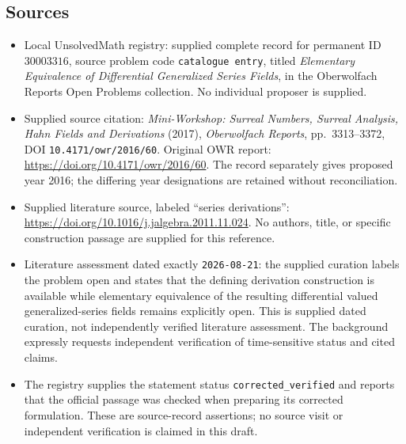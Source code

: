 \documentclass[11pt]{article}
\begin{document}
\subsection{Sources}
\begin{itemize}
\item Local UnsolvedMath registry: supplied complete record for permanent ID \(30003316\), source problem code \texttt{catalogue entry}, titled \emph{Elementary Equivalence of Differential Generalized Series Fields}, in the Oberwolfach Reports Open Problems collection. No individual proposer is supplied.
\item Supplied source citation: \emph{Mini-Workshop: Surreal Numbers, Surreal Analysis, Hahn Fields and Derivations} (2017), \emph{Oberwolfach Reports}, pp.\ 3313--3372, DOI \texttt{10.4171/owr/2016/60}. Original OWR report: \url{https://doi.org/10.4171/owr/2016/60}. The record separately gives proposed year 2016; the differing year designations are retained without reconciliation.
\item Supplied literature source, labeled ``series derivations'': \url{https://doi.org/10.1016/j.jalgebra.2011.11.024}. No authors, title, or specific construction passage are supplied for this reference.
\item Literature assessment dated exactly \texttt{2026-08-21}: the supplied curation labels the problem open and states that the defining derivation construction is available while elementary equivalence of the resulting differential valued generalized-series fields remains explicitly open. This is supplied dated curation, not independently verified literature assessment. The background expressly requests independent verification of time-sensitive status and cited claims.
\item The registry supplies the statement status \texttt{corrected\_verified} and reports that the official passage was checked when preparing its corrected formulation. These are source-record assertions; no source visit or independent verification is claimed in this draft.
\end{itemize}
\end{document}
